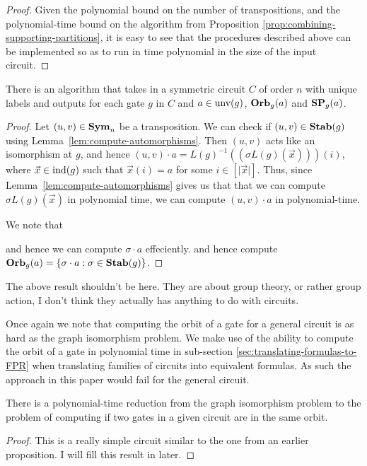 \documentclass[../paper.tex]{subfiles}
\begin{document}
\begin{proof}
  Given the polynomial bound on the number of transpositions, and the
  polynomial-time bound on the algorithm from Proposition
  \ref{prop:combining-supporting-partitions}, it is easy to see that the
  procedures described above can be implemented so as to run in time polynomial
  in the size of the input circuit.
\end{proof}

\begin{lem}
  There is an algorithm that takes in a symmetric circuit $C$ of order $n$ with unique labels and outputs for each gate $g$ in $C$ and $a \in \text{unv}(g)$, $\text{\textbf{Orb}}_g (a)$ and $\text{\textbf{SP}}_g (a)$.
\end{lem}
\begin{proof}
  Let $(u,v) \in \text{\textbf{Sym}}_n$ be a transposition. We can check if $(u,v) \in \text{\textbf{Stab}}(g)$ using Lemma~\ref{lem:compute-automorphisms}. Then $(u,v)$ acts like an isomorphism at $g$, and hence $(u,v) \cdot a = L(g)^{-1}((\sigma L(g)(\vec{x}))) (i)$, where $\vec{x} \in \text{\upshape ind}(g)$ such that $\vec{x} (i) = a$ for some $i \in [\vert \vec{x} \vert]$. Thus, since Lemma~\ref{lem:compute-automorphisms} gives us that that we can compute $\sigma L(g)(\vec{x})$ in polynomial time, we can compute $(u,v) \cdot a$ in polynomial-time. 

  We note that 
  
  and hence we can compute $\sigma \cdot a$ effeciently.  and hence compute $\text{\textbf{Orb}}_g(a) = \{ \sigma \cdot a : \sigma \in \text{\textbf{Stab}}(g)\}$.

\end{proof}

\begin{remark}
  The above result shouldn't be here. They are about group theory, or rather
  group action, I don't think they actually has anything to do with circuits.
\end{remark}

Once again we note that computing the orbit of a gate for a general circuit is
as hard as the graph isomorphism problem. We make use of the ability to compute
the orbit of a gate in polynomial time in sub-section
\ref{sec:translating-formulas-to-FPR} when translating families of circuits into
equivalent formulas. As such the approach in this paper would fail for the
general circuit.

\begin{prop}
  There is a polynomial-time reduction from the graph isomorphism problem to the
  problem of computing if two gates in a given circuit are in the same orbit.
\end{prop}
\begin{proof}
  This is a really simple circuit similar to the one from an earlier
  proposition. I will fill this result in later.
\end{proof}
\end{document}
